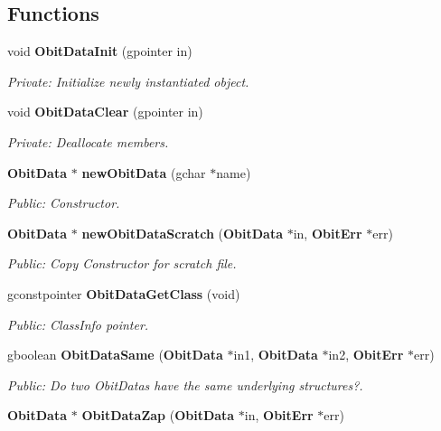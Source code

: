 \subsection*{Functions}
\begin{CompactItemize}
\item 
void {\bf Obit\-Data\-Init} (gpointer in)
\begin{CompactList}\small\item\em Private: Initialize newly instantiated object. \item\end{CompactList}\item 
void {\bf Obit\-Data\-Clear} (gpointer in)
\begin{CompactList}\small\item\em Private: Deallocate members. \item\end{CompactList}\item 
{\bf Obit\-Data} $\ast$ {\bf new\-Obit\-Data} (gchar $\ast$name)
\begin{CompactList}\small\item\em Public: Constructor. \item\end{CompactList}\item 
{\bf Obit\-Data} $\ast$ {\bf new\-Obit\-Data\-Scratch} ({\bf Obit\-Data} $\ast$in, {\bf Obit\-Err} $\ast$err)
\begin{CompactList}\small\item\em Public: Copy Constructor for scratch file. \item\end{CompactList}\item 
gconstpointer {\bf Obit\-Data\-Get\-Class} (void)
\begin{CompactList}\small\item\em Public: Class\-Info pointer. \item\end{CompactList}\item 
gboolean {\bf Obit\-Data\-Same} ({\bf Obit\-Data} $\ast$in1, {\bf Obit\-Data} $\ast$in2, {\bf Obit\-Err} $\ast$err)
\begin{CompactList}\small\item\em Public: Do two Obit\-Datas have the same underlying structures?. \item\end{CompactList}\item 
{\bf Obit\-Data} $\ast$ {\bf Obit\-Data\-Zap} ({\bf Obit\-Data} $\ast$in, {\bf Obit\-Err} $\ast$err)

\end{CompactItemize}
